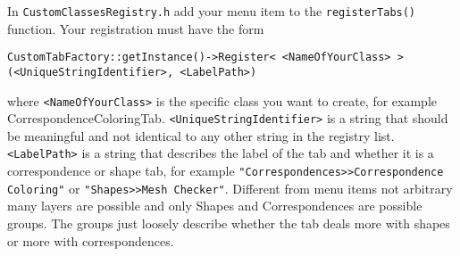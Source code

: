 In \texttt{CustomClassesRegistry.h} add your menu item to the \texttt{registerTabs()} function. Your registration must have the form
 
\texttt{CustomTabFactory::getInstance()->Register< <NameOfYourClass> > \linebreak
	\hspace*{2ex}(<UniqueStringIdentifier>, <LabelPath>)}

where \texttt{<NameOfYourClass>} is the specific class you want to create, for example CorrespondenceColoringTab. \texttt{<UniqueStringIdentifier>} is a string that should be meaningful and not identical to any other string in the registry list. \texttt{<LabelPath>} is a string that describes the label of the tab and whether it is a correspondence or shape tab, for example \texttt{"Correspondences>>Correspondence Coloring"} or \texttt{"Shapes>>Mesh Checker"}. Different from menu items not arbitrary many layers are possible and only Shapes and Correspondences are possible groups. The groups just loosely describe whether the tab deals more with shapes or more with correspondences.